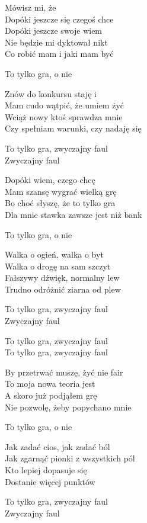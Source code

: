 \begin{text}
    Mówisz mi, że\\
    Dopóki jeszcze się czegoś chce\\
    Dopóki jeszcze swoje wiem\\
    Nie będzie mi dyktował nikt\\
    Co robić mam i jaki mam być

    To tylko gra, o nie

    Znów do konkursu staję i\\
    Mam cudo wątpić, że umiem żyć\\
    Wciąż nowy ktoś sprawdza mnie\\
    Czy spełniam warunki, czy nadaję się

    To tylko gra, zwyczajny faul\\
    Zwyczajny faul

    Dopóki wiem, czego chcę\\
    Mam szansę wygrać wielką grę\\
    Bo choć słyszę, że to tylko gra\\
    Dla mnie stawka zawsze jest niż bank

    To tylko gra, o nie

    Walka o ogień, walka o byt\\
    Walka o drogę na sam szczyt\\
    Fałszywy dźwięk, normalny lew\\
    Trudno odróżnić ziarna od plew

    To tylko gra, zwyczajny faul\\
    Zwyczajny faul

    To tylko gra, zwyczajny faul\\
    To tylko gra, zwyczajny faul

    By przetrwać muszę, żyć nie fair\\
    To moja nowa teoria jest\\
    A skoro już podjąłem grę\\
    Nie pozwolę, żeby popychano mnie

    To tylko gra, o nie

    Jak zadać cios, jak zadać ból\\
    Jak zgarnąć pionki z wszystkich pól\\
    Kto lepiej dopasuje się\\
    Dostanie więcej punktów

    To tylko gra, zwyczajny faul\\
    Zwyczajny faul
\end{text}
\begin{chord}

\end{chord}
